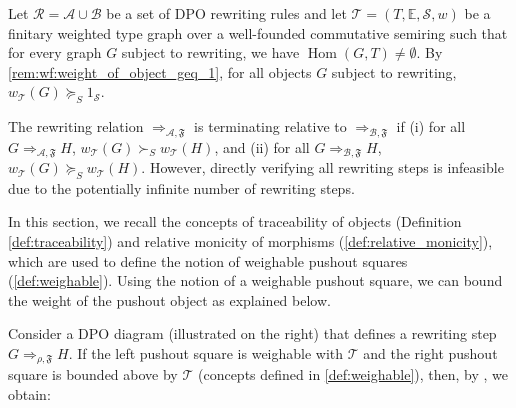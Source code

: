 Let \( \mathcal{R} = \mathcal{A} \cup \mathcal{B} \) be a set of DPO rewriting rules and let $\mathcal{T}=(T,\mathbb{E},\mathcal{S},w)$ be a finitary weighted type graph over a well-founded commutative semiring such that for every graph $G$ subject to rewriting, we have $\operatorname{Hom}(G,T)\neq \emptyset$. By \autoref{rem:wf:weight_of_object_geq_1}, for all objects \( G \) subject to rewriting, \(w_\mathcal{T}(G) \succeq_S 1_\mathcal{S} \).

The rewriting relation \( \Rightarrow_{\mathcal{A},\mathfrak{F}} \) is terminating relative to $\Rightarrow_{\mathcal{B},\mathfrak{F}}$ if (i) for all \(G \Rightarrow_{\mathcal{A},\mathfrak{F}} H\), \( w_\mathcal{T}(G) \succ_S w_\mathcal{T}(H)\), and (ii) for all \(G \Rightarrow_{\mathcal{B},\mathfrak{F}} H\), \( w_\mathcal{T}(G) \succeq_S w_\mathcal{T}(H) \). However, directly verifying all rewriting steps is infeasible due to the potentially infinite number of rewriting steps.

In this section, we recall the concepts of traceability of objects (Definition \ref{def:traceability}) and relative monicity of morphisms (\autoref{def:relative_monicity}), which are used to define the notion of weighable pushout squares (\autoref{def:weighable}). Using the notion of a weighable pushout square, we can bound the weight of the pushout object as explained below.

\noindent
\begin{minipage}{0.7\textwidth}\setlength{\parindent}{1em}
    Consider a DPO diagram (illustrated on the right) that defines a rewriting step \( G \Rightarrow_{\rho,\mathfrak{F}} H \). 
    If the left pushout square is weighable with $\mathcal{T}$ and the right pushout square is bounded above by $\mathcal{T}$ (concepts defined in \autoref{def:weighable}), then, by \cite[Lemma 4.13]{endrullis2024generalized_arxiv_v2}, we obtain:
\end{minipage}%
\hfill
\begin{minipage}{0.29\textwidth}
    \hfill
\end{minipage}

